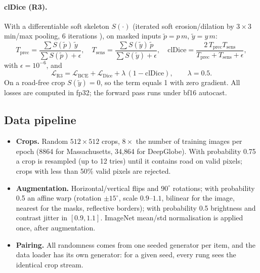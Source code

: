 \documentclass[11pt]{article}
\begin{document}
\paragraph{clDice (R3).} With a differentiable soft skeleton $S(\cdot)$ (iterated soft
erosion/dilation by $3\times3$ min/max pooling, 6 iterations \cite{shit2021}), on masked inputs
$\tilde p = p\,m$, $\tilde y = y\,m$:
\begin{equation}
  T_{\mathrm{prec}} = \frac{\sum S(\tilde p)\,\tilde y}{\sum S(\tilde p)+\epsilon},\quad
  T_{\mathrm{sens}} = \frac{\sum S(\tilde y)\,\tilde p}{\sum S(\tilde y)+\epsilon},\quad
  \mathrm{clDice} = \frac{2\,T_{\mathrm{prec}}T_{\mathrm{sens}}}{T_{\mathrm{prec}}+T_{\mathrm{sens}}+\epsilon},
\end{equation}
with $\epsilon=10^{-6}$, and
\begin{equation}
  \mathcal{L}_{\mathrm{R3}} = \mathcal{L}_{\mathrm{BCE}} + \mathcal{L}_{\mathrm{Dice}} + \lambda\,(1-\mathrm{clDice}),\qquad \lambda = 0.5.
\end{equation}
On a road-free crop $S(\tilde y)=0$, so the term equals 1 with zero gradient. All losses are
computed in fp32; the forward pass runs under bf16 autocast.

\subsection{Data pipeline}

\begin{itemize}
  \item \textbf{Crops.} Random $512\times512$ crops, $8\times$ the number of training images per
        epoch (8864 for Massachusetts, 34{,}864 for DeepGlobe). With probability 0.75 a crop is
        resampled (up to 12 tries) until it contains road on valid pixels; crops with less than
        50\% valid pixels are rejected.
  \item \textbf{Augmentation.} Horizontal/vertical flips and $90^\circ$ rotations; with probability
        0.5 an affine warp (rotation $\pm15^\circ$, scale $0.9$--$1.1$, bilinear for the image,
        nearest for the masks, reflective borders); with probability 0.5 brightness and contrast
        jitter in $[0.9, 1.1]$. ImageNet mean/std normalisation is applied once, after augmentation.
  \item \textbf{Pairing.} All randomness comes from one seeded generator per item, and the data
        loader has its own generator: for a given seed, every rung sees the identical crop stream.
\end{itemize}
\end{document}
